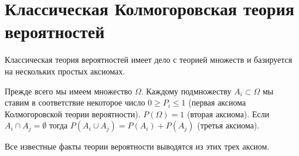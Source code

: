 \section{Классическая Колмогоровская теория вероятностей}

Классическая теория вероятностей имеет дело с теорией множеств и
базируется на нескольких простых аксиомах. 

Прежде всего мы имеем множество $\Omega$.
Каждому подмножеству $A_i \subset \Omega$ мы ставим в соответствие
некоторое число $0 \ge P_i \le 1$ (первая аксиома Колмогоровской
теории вероятности). $P\left(\Omega\right) = 1$ (вторая аксиома). 
Если $A_i \cap A_j = \emptyset$ тогда 
$P\left(A_i \cup A_j\right) = P\left(A_i\right) + P\left(A_j\right)$
(третья аксиома).

Все известные факты теории вероятности выводятся из этих трех аксиом.  


